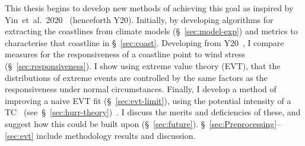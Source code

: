 This thesis begins to develop new methods of achieving this goal
as inspired by Yin~et~al.~2020~\cite{ZannaPreprint} (henceforth Y20).
Initially, by developing algorithms for extracting the coastlines from climate models (§~\ref{sec:model-exp})
and metrics to characterise that coastline in §~\ref{sec:coast}.
Developing from Y20~\cite{ZannaPreprint}, I compare measures for the
responsiveness of a coastline point to wind stress (§~\ref{sec:responsiveness}).
I show using extreme value theory (EVT), that the
distributions of extreme events are controlled by the same factors as
the responsiveness under normal circumstances.
Finally, I develop a
method of improving a naive EVT fit (§~\ref{sec:evt-limit}),
using the potential intensity of a TC~\cite{emanuel1999thermodynamic}
(see~§~\ref{sec:hurr-theory})~\cite{emanuel1987dependence,
 emanuel2016predictability}.
I discuss the merits and deficiencies of these,
and suggest how this could be built upon (§~\ref{sec:future}).
§~\ref{sec:Preprocessing}--\ref{sec:evt} include methodology
results and discussion.
